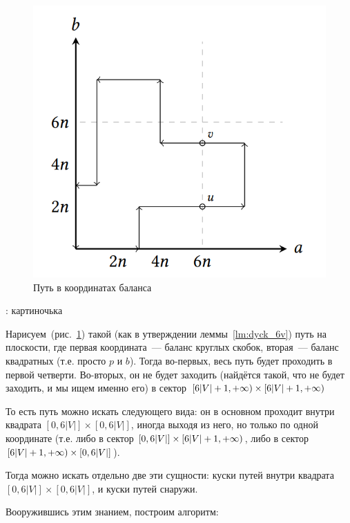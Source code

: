 \begin{figure}[h]
  \includegraphics[width=0.75\linewidth]{img/6n_6n_path}
  \caption{Путь в координатах баланса}
  \label{img:6v_path}
\end{figure}

\TODO: картиночька

Нарисуем~(рис.~\ref{img:6v_path}) такой (как в утверждении леммы~\ref{lm:dyck_6v}) путь на плоскости, где первая координата~--- баланс круглых скобок, вторая~--- баланс квадратных (т.е. просто $p$ и $b$). Тогда во-первых, весь путь будет проходить в первой четверти. Во-вторых, он не будет заходить (найдётся такой, что не будет заходить, и мы ищем именно его) в сектор $[6|V|+1, +\infty) \times [6|V|+1, +\infty)$
    
То есть путь можно искать следующего вида: он в основном проходит внутри квадрата $[0, 6|V|] \times [0, 6|V|]$, иногда выходя из него, но только по одной координате (т.е. либо в сектор $[0, 6|V|] \times [6|V| + 1, +\infty)$, либо в сектор $[6|V| + 1, +\infty) \times [0, 6|V|]$).

Тогда можно искать отдельно две эти сущности: куски путей внутри квадрата $[0, 6|V|] \times [0, 6|V|]$, и куски путей снаружи.

Вооружившись этим знанием, построим алгоритм:

